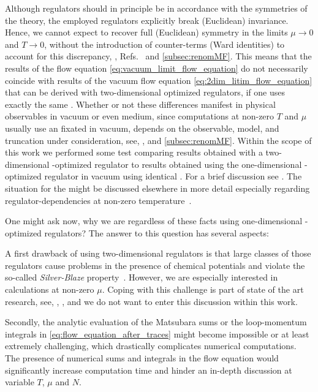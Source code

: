 Although regulators should in principle be in accordance with the symmetries of the theory, the employed regulators explicitly break (Euclidean) \Poincare{} invariance.
Hence, we cannot expect to recover full (Euclidean) \Poincare{} symmetry in the limits $\mu \rightarrow 0$ and $T \rightarrow 0$, without the introduction of counter-terms (Ward identities) to account for this discrepancy, \eg{}, Refs.~\cite{Braun:2017srn,Pawlowski:2017gxj} and \cref{subsec:renomMF}.
This means that the \ir{} results of the \frg{} flow equation \eqref{eq:vacuum_limit_flow_equation} do not necessarily coincide with \ir{} results of the vacuum \lpa{} flow equation \eqref{eq:2dim_litim_flow_equation} that can be derived with two-dimensional \lpa{} optimized regulators, if one uses exactly the same \uv{} \ic{}.
Whether or not these differences manifest in physical observables in vacuum or even medium, since computations at non-zero $T$ and $\mu$ usually use an \uv{} \ic{} fixated in vacuum, depends on the observable, model, and truncation under consideration, see, \eg{},  and \cref{subsec:renomMF}.
Within the scope of this work we performed some test comparing results obtained with a two-dimensional \lpa{}-optimized regulator to results obtained using the one-dimensional \lpa{}-optimized regulator in vacuum using identical \ics{}.
For a brief discussion see \gnAppVacFlow{}.
The situation for the \gnyBm{} might be discussed elsewhere in more detail especially regarding regulator-dependencies at non-zero temperature~\cite{Zorbach:2021thesis}.\bigskip
	
One might ask now, why we are \dash{} regardless of these facts \dash{} using one-dimensional \lpa{}-optimized regulators? The answer to this question has several aspects:
	
A first drawback of using two-dimensional regulators is that large classes of those regulators cause problems in the presence of chemical potentials and violate the so-called \textit{Silver-Blaze} property~\cite{Cohen:2003kd,Marko:2014hea,Khan:2015puu,Leonhardt:2019mpy}.
However, we are especially interested in calculations at non-zero $\mu$.
Coping with this challenge is part of state of the art research, see, \eg{}, , and we do not want to enter this discussion within this work.
	
Secondly, the analytic evaluation of the Matsubara sums or the loop-momentum integrals in \cref{eq:flow_equation_after_traces} might become impossible or at least extremely challenging, which drastically complicates numerical computations.
The presence of numerical sums and integrals in the flow equation would significantly increase computation time and hinder an in-depth discussion at variable $T$, $\mu$ and $N$. 
	
